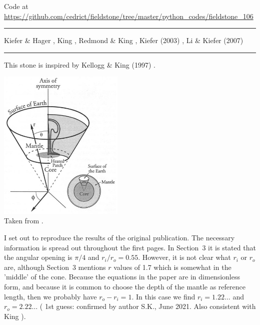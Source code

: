

\begin{center}
Code at \url{https://github.com/cedrict/fieldstone/tree/master/python_codes/fieldstone_106}
\end{center}

\par\noindent\rule{\textwidth}{0.4pt}

\Literature Kiefer \& Hager \cite{kiha92}, King \cite{king97}, Redmond \& King \cite{reki04},
Kiefer (2003) \cite{kief03}, Li \& Kiefer (2007) \cite{liki07}

\par\noindent\rule{\textwidth}{0.4pt}

This stone is inspired by Kellogg \& King (1997) \cite{keki97}. 

\begin{center}
\includegraphics[width=6cm]{python_codes/fieldstone_106/images/keki97a}\\
{\captionfont Taken from \cite{keki97}.}
\end{center}

I set out to reproduce the results of the original publication. 
The necessary information is spread out throughout the first pages.
In Section~3 it is stated that the angular opening is $\pi/4$ and $r_i/r_o=0.55$.
However, it is not clear what $r_i$ or $r_o$ are, although Section~3
mentions $r$ values of 1.7 which is somewhat in the 'middle' of the cone. 
Because the equations in the paper are in dimensionless form, and 
because it is common to choose the depth of the mantle as reference length, 
then we probably have $r_o-r_i=1$. In this case we find $r_i=1.22\dots$ and 
$r_o=2.22\dots$ ({\color{orange} 1st guess}: confirmed by author S.K., June 2021. 
Also consistent with King \cite{king97}).

